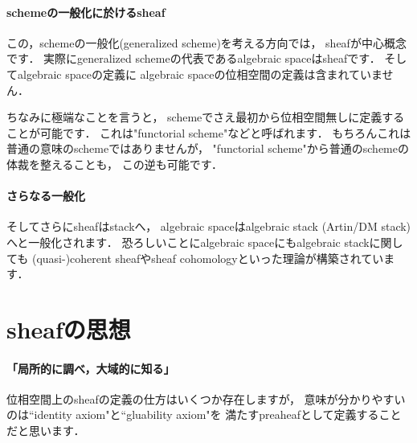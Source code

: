 \documentclass[]{jsarticle}
\begin{document}
    \paragraph{schemeの一般化に於けるsheaf}
    この，schemeの一般化(generalized scheme)を考える方向では，
    sheafが中心概念です．
    実際にgeneralized schemeの代表であるalgebraic spaceはsheafです．
    そしてalgebraic spaceの定義に
    algebraic spaceの位相空間の定義は含まれていません．
    
    ちなみに極端なことを言うと，
    schemeでさえ最初から位相空間無しに定義することが可能です．
    これは"functorial scheme"などと呼ばれます．
    もちろんこれは普通の意味のschemeではありませんが，
    "functorial scheme"から普通のschemeの体裁を整えることも，
    この逆も可能です．

    \paragraph{さらなる一般化}
    そしてさらにsheafはstackへ，
    algebraic spaceはalgebraic stack (Artin/DM stack)へと一般化されます．
    恐ろしいことにalgebraic spaceにもalgebraic stackに関しても
    (quasi-)coherent sheafやsheaf cohomologyといった理論が構築されています．

\section{sheafの思想}
    \paragraph{「局所的に調べ，大域的に知る」}
    位相空間上のsheafの定義の仕方はいくつか存在しますが，
    意味が分かりやすいのは``identity axiom"と``gluability axiom"を
    満たすpreaheafとして定義することだと思います．
\end{document}
